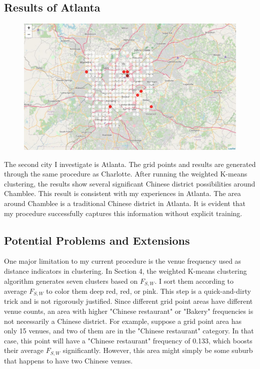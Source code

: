 \documentclass{article}
\begin{document}
\subsection{Results of Atlanta}

\begin{figure}[h!]
\includegraphics[width=1.0\textwidth]{cn5.jpg}
\centering
\end{figure}

The second city I investigate is Atlanta.
The grid points and results are generated through the same procedure as Charlotte.
After running the weighted K-means clustering, the results show several significant Chinese district possibilities around Chamblee.
This result is consistent with my experiences in Atlanta.
The area around Chamblee is a traditional Chinese district in Atlanta.
It is evident that my procedure successfully captures this information without explicit training.

\newpage

\subsection{Potential Problems and Extensions}
One major limitation to my current procedure is the venue frequency used as distance indicators in clustering.
In Section 4, the weighted K-means clustering algorithm generates seven clusters based on $F_{S, W}$. I sort them according to average $F_{S, W}$ to color them deep red, red, or pink.
This step is a quick-and-dirty trick and is not rigorously justified.
Since different grid point areas have different venue counts, an area with higher "Chinese restaurant" or "Bakery" frequencies is not necessarily a Chinese district.
For example, suppose a grid point area has only 15 venues, and two of them are in the "Chinese restaurant" category. In that case, this point will have a "Chinese restaurant" frequency of 0.133, which boosts their average $F_{S, W}$ significantly.
However, this area might simply be some suburb that happens to have two Chinese venues.
\end{document}
